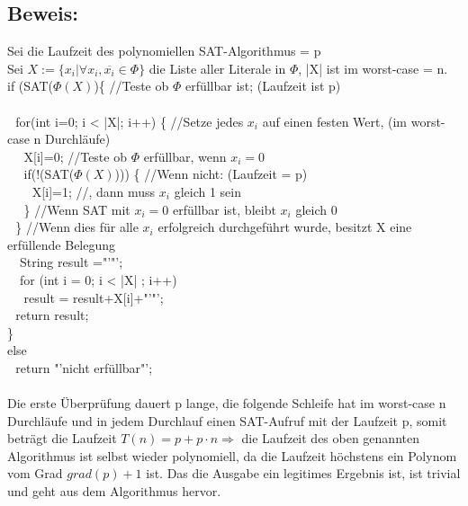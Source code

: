 \documentclass[a4paper,11pt,twoside]{article}
\begin{document}
\subsection*{Beweis:}
Sei die Laufzeit des polynomiellen SAT-Algorithmus = p\\
Sei $X:=\{x_i| \forall x_i,\overline{x_i} \in \Phi\}$ die Liste aller Literale in $\Phi$, |X| ist im worst-case = n.\\
if (SAT($\Phi(X)$)\{  //Teste ob $\Phi$ erfüllbar ist; (Laufzeit ist p) \\
\\
$~~~$for(int i=0; i < |X|; i++) \{  //Setze jedes $x_i$ auf einen festen Wert, (im worst-case n Durchläufe)\\
$~~~$$~~~$X[i]=0;  //Teste ob $\Phi$ erfüllbar, wenn $x_i=0$\\
$~~~$$~~~$if(!(SAT($\Phi(X)$))) \{ //Wenn nicht: (Laufzeit = p)\\
$~~~$$~~~$$~~~$X[i]=1; 	//, dann muss $x_i$ gleich 1 sein\\
$~~~$$~~~$\} //Wenn SAT mit $x_i=0$ erfüllbar ist, bleibt $x_i$ gleich 0 \\
$~~~$\} //Wenn dies für alle $x_i$ erfolgreich durchgeführt wurde, besitzt X eine erfüllende Belegung\\
$~~~$ String result ="'"';\\
$~~~$ for (int i = 0; i < |X| ; i++)\\
$~~~$$~~~$result = result+X[i]+"'"';\\
$~~~$return result;\\
\}\\
else\\
$~~~$return "'nicht erfüllbar"';\\
\\
Die erste Überprüfung dauert p lange, die folgende Schleife hat im worst-case n Durchläufe und in jedem Durchlauf einen SAT-Aufruf mit der Laufzeit p, somit beträgt die Laufzeit $T(n)=p+p\cdot n \Rightarrow$ die Laufzeit des oben genannten Algorithmus ist selbst wieder polynomiell, da die Laufzeit höchstens ein Polynom vom Grad $grad(p)+1$ ist. Das die Ausgabe ein legitimes Ergebnis ist, ist trivial und geht aus dem Algorithmus hervor.
\end{document}
